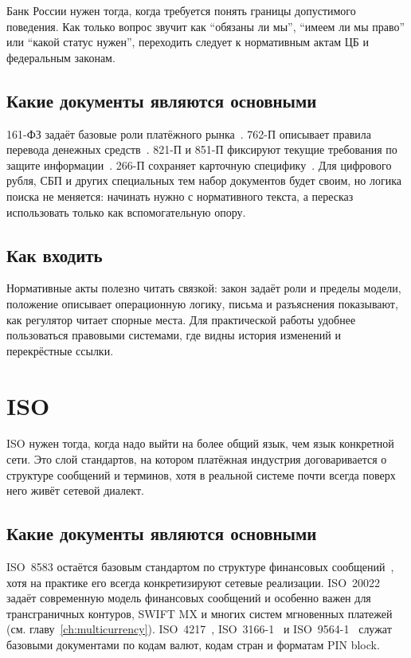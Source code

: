 Банк России нужен тогда, когда требуется понять границы допустимого поведения.
Как только вопрос звучит как \enquote{обязаны ли мы},
\enquote{имеем ли мы право} или \enquote{какой статус нужен},
переходить следует к нормативным актам ЦБ и федеральным законам.

\subsection*{Какие документы являются основными}

161-ФЗ задаёт базовые роли платёжного рынка~\cite{fz-161}.
762-П описывает правила перевода денежных средств~\cite{cbr-762p}.
821-П и 851-П фиксируют текущие требования по защите
информации~\cite{cbr-821p,cbr-851p}. 266-П сохраняет карточную
специфику~\cite{cbr-266p}.
Для цифрового рубля, СБП и других специальных тем набор документов
будет своим, но логика поиска не меняется: начинать нужно
с нормативного текста, а пересказ использовать только
как вспомогательную опору.

\subsection*{Как входить}

Нормативные акты полезно читать связкой: закон задаёт роли
и пределы модели, положение описывает операционную логику,
письма и разъяснения показывают, как регулятор читает спорные
места. Для практической работы удобнее пользоваться правовыми
системами, где видны история изменений и перекрёстные ссылки.

\section{ISO}
\label{sec:ps-iso}

ISO нужен тогда, когда надо выйти на более общий язык, чем язык
конкретной сети. Это слой стандартов, на котором платёжная
индустрия договаривается о структуре сообщений и терминов, хотя
в реальной системе почти всегда поверх него живёт сетевой
диалект.

\subsection*{Какие документы являются основными}

ISO~8583 остаётся базовым стандартом по структуре финансовых
сообщений~\cite{iso-8583-2023}, хотя на практике его всегда
конкретизируют сетевые
реализации. ISO~20022~\cite{iso-20022} задаёт современную модель финансовых
сообщений и особенно важен для трансграничных контуров, SWIFT MX
и многих систем мгновенных платежей
(см. главу~\ref{ch:multicurrency}). ISO~4217~\cite{iso-4217},
ISO~3166-1~\cite{iso-3166-1}
и ISO~9564-1~\cite{iso-9564} служат базовыми документами по кодам валют,
кодам стран и форматам PIN block.


